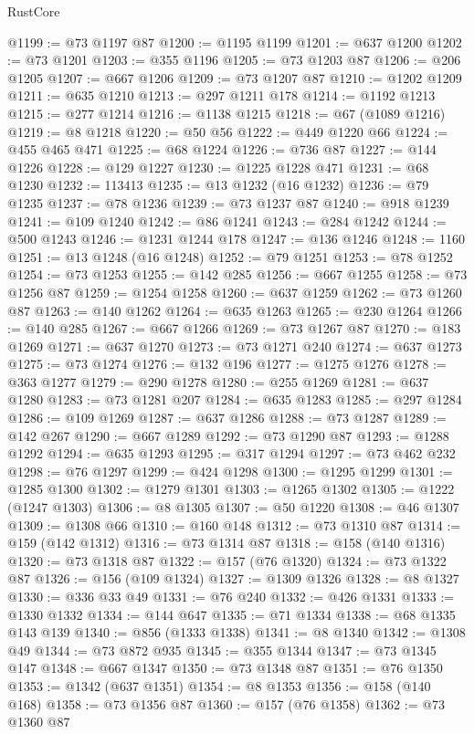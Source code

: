 \begin{lexlean}{RustCore}
\begin{coremodule}
@1199 := @73 @1197 @87
@1200 := @1195 @1199
@1201 := @637 @1200
@1202 := @73 @1201
@1203 := @355 @1196
@1205 := @73 @1203 @87
@1206 := @206 @1205
@1207 := @667 @1206
@1209 := @73 @1207 @87
@1210 := @1202 @1209
@1211 := @635 @1210
@1213 := @297 @1211 @178
@1214 := @1192 @1213
@1215 := @277 @1214
@1216 := @1138 @1215
@1218 := @67 (@1089 @1216)
@1219 := @8 @1218
@1220 := @50 @56
@1222 := @449 @1220 @66
@1224 := @455 @465 @471
@1225 := @68 @1224
@1226 := @736 @87
@1227 := @144 @1226
@1228 := @129 @1227
@1230 := @1225 @1228 @471
@1231 := @68 @1230
@1232 := 113413
@1235 := @13 @1232 (@16 @1232)
@1236 := @79 @1235
@1237 := @78 @1236
@1239 := @73 @1237 @87
@1240 := @918 @1239
@1241 := @109 @1240
@1242 := @86 @1241
@1243 := @284 @1242
@1244 := @500 @1243
@1246 := @1231 @1244 @178
@1247 := @136 @1246
@1248 := 1160
@1251 := @13 @1248 (@16 @1248)
@1252 := @79 @1251
@1253 := @78 @1252
@1254 := @73 @1253
@1255 := @142 @285
@1256 := @667 @1255
@1258 := @73 @1256 @87
@1259 := @1254 @1258
@1260 := @637 @1259
@1262 := @73 @1260 @87
@1263 := @140 @1262
@1264 := @635 @1263
@1265 := @230 @1264
@1266 := @140 @285
@1267 := @667 @1266
@1269 := @73 @1267 @87
@1270 := @183 @1269
@1271 := @637 @1270
@1273 := @73 @1271 @240
@1274 := @637 @1273
@1275 := @73 @1274
@1276 := @132 @196
@1277 := @1275 @1276
@1278 := @363 @1277
@1279 := @290 @1278
@1280 := @255 @1269
@1281 := @637 @1280
@1283 := @73 @1281 @207
@1284 := @635 @1283
@1285 := @297 @1284
@1286 := @109 @1269
@1287 := @637 @1286
@1288 := @73 @1287
@1289 := @142 @267
@1290 := @667 @1289
@1292 := @73 @1290 @87
@1293 := @1288 @1292
@1294 := @635 @1293
@1295 := @317 @1294
@1297 := @73 @462 @232
@1298 := @76 @1297
@1299 := @424 @1298
@1300 := @1295 @1299
@1301 := @1285 @1300
@1302 := @1279 @1301
@1303 := @1265 @1302
@1305 := @1222 (@1247 @1303)
@1306 := @8 @1305
@1307 := @50 @1220
@1308 := @46 @1307
@1309 := @1308 @66
@1310 := @160 @148
@1312 := @73 @1310 @87
@1314 := @159 (@142 @1312)
@1316 := @73 @1314 @87
@1318 := @158 (@140 @1316)
@1320 := @73 @1318 @87
@1322 := @157 (@76 @1320)
@1324 := @73 @1322 @87
@1326 := @156 (@109 @1324)
@1327 := @1309 @1326
@1328 := @8 @1327
@1330 := @336 @33 @49
@1331 := @76 @240
@1332 := @426 @1331
@1333 := @1330 @1332
@1334 := @144 @647
@1335 := @71 @1334
@1338 := @68 @1335 @143 @139
@1340 := @856 (@1333 @1338)
@1341 := @8 @1340
@1342 := @1308 @49
@1344 := @73 @872 @935
@1345 := @355 @1344
@1347 := @73 @1345 @147
@1348 := @667 @1347
@1350 := @73 @1348 @87
@1351 := @76 @1350
@1353 := @1342 (@637 @1351)
@1354 := @8 @1353
@1356 := @158 (@140 @168)
@1358 := @73 @1356 @87
@1360 := @157 (@76 @1358)
@1362 := @73 @1360 @87

\end{coremodule}
\end{lexlean}
